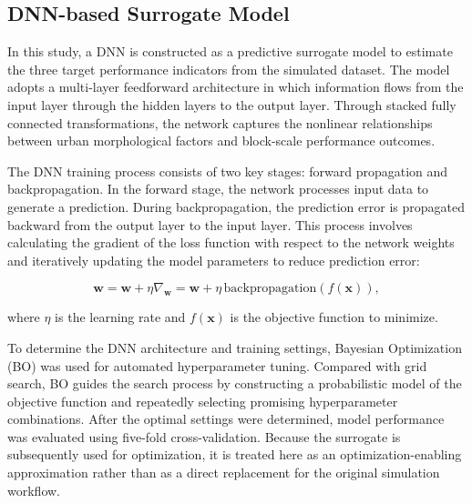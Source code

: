 \documentclass[final,3p,times]{elsarticle}
\begin{document}
\subsection{DNN-based Surrogate Model}

In this study, a DNN is constructed as a predictive surrogate model to estimate the three target performance indicators from the simulated dataset. The model adopts a multi-layer feedforward architecture in which information flows from the input layer through the hidden layers to the output layer. Through stacked fully connected transformations, the network captures the nonlinear relationships between urban morphological factors and block-scale performance outcomes.

The DNN training process consists of two key stages: forward propagation and backpropagation. In the forward stage, the network processes input data to generate a prediction. During backpropagation, the prediction error is propagated backward from the output layer to the input layer. This process involves calculating the gradient of the loss function with respect to the network weights and iteratively updating the model parameters to reduce prediction error:

\begin{equation}
\mathbf{w} = \mathbf{w} + \eta \nabla_{\mathbf{w}} = \mathbf{w} + \eta\,\mathrm{backpropagation}\!\left(f(\mathbf{x})\right),
\end{equation}

where $\eta$ is the learning rate and $f(\mathbf{x})$ is the objective function to minimize.

To determine the DNN architecture and training settings, Bayesian Optimization (BO) was used for automated hyperparameter tuning. Compared with grid search, BO guides the search process by constructing a probabilistic model of the objective function and repeatedly selecting promising hyperparameter combinations. After the optimal settings were determined, model performance was evaluated using five-fold cross-validation. Because the surrogate is subsequently used for optimization, it is treated here as an optimization-enabling approximation rather than as a direct replacement for the original simulation workflow.
\end{document}
